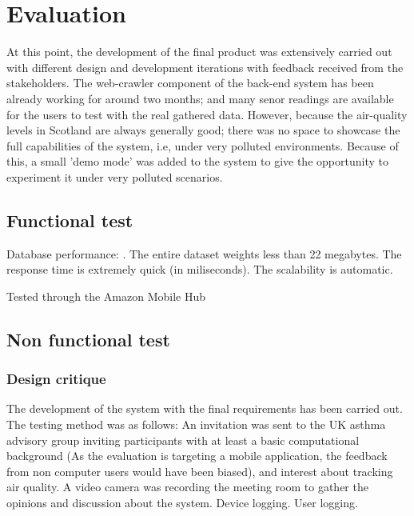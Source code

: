\chapter{Evaluation}
At this point, the development of the final product was extensively carried out with different design and development iterations with feedback received from the stakeholders. The web-crawler component of the back-end system has been already working for around two months; and many senor readings are available for the users to test with the real gathered data. However, because the air-quality levels in Scotland are always generally good; there was no space to showcase the full capabilities of the system, i.e, under very polluted environments. Because of this, a small 'demo mode' was added to the system to give the opportunity to experiment it under very polluted scenarios. 

\iffalse
\subsection{User sampling}
According to Scholtz \cite{Scholtz2003}, the evaluation should be realized with around 5 participants per representative class of users. Unfortunately, due to time restrictions, the evaluation was realized with only one class of users.The evaluation was carried out with 4 users, one of them individually, and other three users as a group. 
\fi

\section{Functional test}


Database performance: . The entire dataset weights less than 22 megabytes. The response time is extremely quick (in miliseconds). The scalability is automatic. 



Tested through the Amazon Mobile Hub



\section{Non functional test}

\subsection{Design critique}


The development of the system with the final requirements has been carried out. 
The testing method was as follows: An invitation was sent to the UK asthma advisory group inviting participants with at least a basic computational background (As the evaluation is targeting a mobile application, the feedback from non computer users would have been biased), and interest about tracking air quality. 
A video camera was recording the meeting room to gather the opinions and discussion about the system. 
Device logging. 
User logging. 